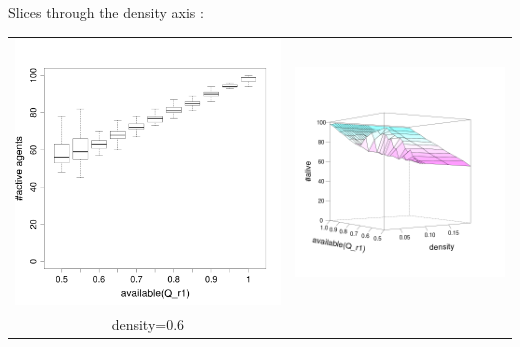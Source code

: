 \documentclass[8pt, handout=show,notes=show]{beamer}
\begin{document}
\begin{frame}{ Slices through the density axis : }
\begin{table}[H]
\begin{tabular}{cc}
			\includegraphics[width=\imgSize]{images/alive_r1_density-60.png}&
			\includegraphics[width=\imgSize]{images/active_median}\\
			density=0.6&\\
		\end{tabular}

	\end{table}

\end{frame}
\end{document}
